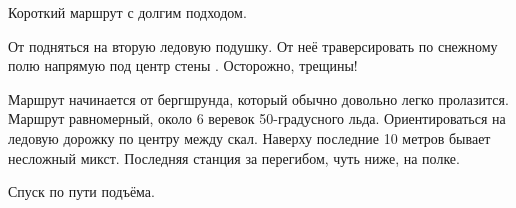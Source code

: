 Короткий маршрут с долгим подходом.

От  подняться на вторую ледовую
подушку. От неё траверсировать по снежному полю напрямую под центр
стены \geoPeakIzyskatel{}. Осторожно, трещины!

Маршрут начинается от бергшрунда, который обычно довольно легко
пролазится. Маршрут равномерный, около 6 веревок 50-градусного льда.
Ориентироваться на ледовую дорожку по центру между скал. Наверху
последние 10 метров бывает несложный микст. Последняя станция за
перегибом, чуть ниже, на полке.

Спуск по пути подъёма.

